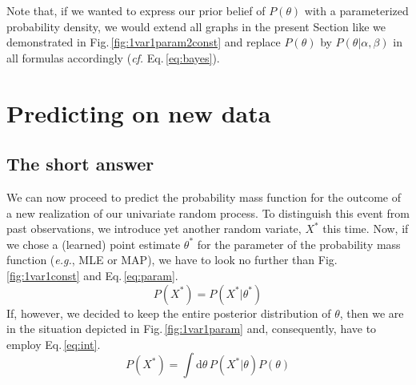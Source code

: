 \documentclass[]{report}
\begin{document}
Note that, if we wanted to express our prior belief of $P(\theta)$ with a parameterized probability density, we would extend all graphs in the present Section like we demonstrated in Fig.\,\ref{fig:1var1param2const} and replace $P( \theta ) $ by $P( \theta | \alpha, \beta ) $ in all formulas accordingly (\textit{cf.} Eq.\,\ref{eq:bayes}).


\section{Predicting on new data} \label{sect:predict_new}
\subsection{The short answer}
We can now proceed to predict the probability mass function for the outcome of a new realization of our univariate random process. To distinguish this event from past observations, we introduce yet another random variate, $X^*$ this time. Now, if we chose a (learned) point estimate $\theta^*$ for the parameter of the probability mass function (\textit{e.g.}, MLE or MAP), we have to look no further than Fig.\,\ref{fig:1var1const} and Eq.\,\ref{eq:param}.
\begin{equation}
P( X^* )
=
P( X^* | \theta^* )
\end{equation}
If, however, we decided to keep the entire posterior distribution of $\theta$, then we are in the situation depicted in Fig.\,\ref{fig:1var1param} and, consequently, have to employ Eq.\,\ref{eq:int}.
\begin{equation}
P(X^*)
=
\int \mathrm{d}\theta \,
	P( X^* | \theta )
	P( \theta )
\end{equation}
\end{document}
